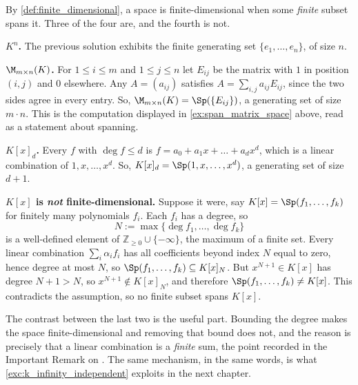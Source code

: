 \begin{exercisesolution}
\label{sol:finite_dimensional_examples}
By \cref{def:finite_dimensional}, a space is finite-di\-men\-sional when some \emph{finite} subset spans it. Three of the four are, and the fourth is not.

\textbf{$K^n$.} The previous solution exhibits the finite generating set $\{e_1, \dots, e_n\}$, of size $n$.

\textbf{$\M_{m \times n}(K)$.} For $1 \le i \le m$ and $1 \le j \le n$ let $E_{ij}$ be the matrix with $1$ in position $(i,j)$ and $0$ elsewhere. Any $A = (a_{ij})$ satisfies $A = \sum_{i,j} a_{ij} E_{ij}$, since the two sides agree in every entry. So, $\M_{m \times n}(K) = \Sp(\{E_{ij}\})$, a generating set of size $m \cdot n$. This is the computation displayed in \cref{ex:span_matrix_space} above, read as a statement about spanning.

\textbf{$K[x]_d$.} Every $f$ with $\deg f \le d$ is $f = a_0 + a_1 x + \dots + a_d x^d$, which is a linear combination of $1, x, \dots, x^d$. So, $K[x]_d = \Sp(1, x, \dots, x^d)$, a generating set of size $d+1$.

\textbf{$K[x]$ is \emph{not} finite-di\-men\-sional.} Suppose it were, say $K[x] = \Sp(f_1, \dots, f_k)$ for finitely many polynomials $f_i$. Each $f_i$ has a degree, so
\[
    N := \max \{ \deg f_1, \dots, \deg f_k \}
\]
is a well-defined element of $\mathbb{Z}_{\ge 0} \cup \{-\infty\}$, the maximum of a finite set. Every linear combination $\sum_i \alpha_i f_i$ has all coefficients beyond index $N$ equal to zero, hence degree at most $N$, so $\Sp(f_1, \dots, f_k) \subseteq K[x]_N$. But $x^{N+1} \in K[x]$ has degree $N+1 > N$, so $x^{N+1} \notin K[x]_N$, and therefore $\Sp(f_1, \dots, f_k) \ne K[x]$. This contradicts the assumption, so no finite subset spans $K[x]$.

The contrast between the last two is the useful part. Bounding the degree makes the space finite-di\-men\-sional and removing that bound does not, and the reason is precisely that a linear combination is a \emph{finite} sum, the point recorded in the Important Remark on . The same mechanism, in the same words, is what \cref{exc:k_infinity_independent} exploits in the next chapter.
\end{exercisesolution}




